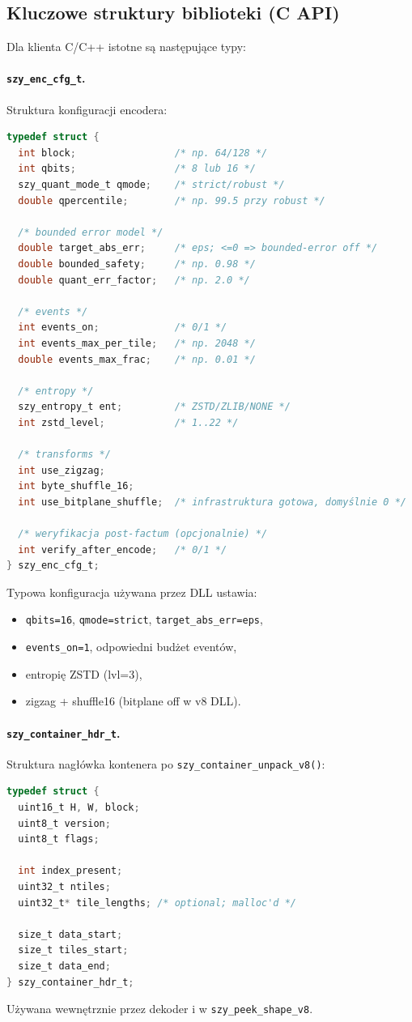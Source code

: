\documentclass[11pt,a4paper]{article}
\begin{document}
\subsection{Kluczowe struktury biblioteki (C API)}
Dla klienta C/C++ istotne są następujące typy:

\paragraph{\texttt{szy\_enc\_cfg\_t}.}
Struktura konfiguracji encodera:
\begin{lstlisting}[style=cstyle,language=C]
typedef struct {
  int block;                 /* np. 64/128 */
  int qbits;                 /* 8 lub 16 */
  szy_quant_mode_t qmode;    /* strict/robust */
  double qpercentile;        /* np. 99.5 przy robust */

  /* bounded error model */
  double target_abs_err;     /* eps; <=0 => bounded-error off */
  double bounded_safety;     /* np. 0.98 */
  double quant_err_factor;   /* np. 2.0 */

  /* events */
  int events_on;             /* 0/1 */
  int events_max_per_tile;   /* np. 2048 */
  double events_max_frac;    /* np. 0.01 */

  /* entropy */
  szy_entropy_t ent;         /* ZSTD/ZLIB/NONE */
  int zstd_level;            /* 1..22 */

  /* transforms */
  int use_zigzag;
  int byte_shuffle_16;
  int use_bitplane_shuffle;  /* infrastruktura gotowa, domyślnie 0 */

  /* weryfikacja post-factum (opcjonalnie) */
  int verify_after_encode;   /* 0/1 */
} szy_enc_cfg_t;
\end{lstlisting}
Typowa konfiguracja używana przez DLL ustawia:
\begin{itemize}
  \item \texttt{qbits=16}, \texttt{qmode=strict}, \texttt{target\_abs\_err=eps},
  \item \texttt{events\_on=1}, odpowiedni budżet eventów,
  \item entropię ZSTD (lvl=3),
  \item zigzag + shuffle16 (bitplane off w v8 DLL).
\end{itemize}

\paragraph{\texttt{szy\_container\_hdr\_t}.}
Struktura nagłówka kontenera po \texttt{szy\_container\_unpack\_v8()}:
\begin{lstlisting}[style=cstyle,language=C]
typedef struct {
  uint16_t H, W, block;
  uint8_t version;
  uint8_t flags;

  int index_present;
  uint32_t ntiles;
  uint32_t* tile_lengths; /* optional; malloc'd */

  size_t data_start;
  size_t tiles_start;
  size_t data_end;
} szy_container_hdr_t;
\end{lstlisting}
Używana wewnętrznie przez dekoder i w \texttt{szy\_peek\_shape\_v8}.
\end{document}
